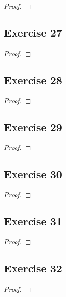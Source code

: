 \documentclass[14pt]{extarticle}
\begin{document}
\begin{proof}

\end{proof}

\subsection{Exercise 27}

\begin{proof}

\end{proof}

\subsection{Exercise 28}

\begin{proof}

\end{proof}

\subsection{Exercise 29}

\begin{proof}

\end{proof}

\subsection{Exercise 30}

\begin{proof}

\end{proof}

\subsection{Exercise 31}

\begin{proof}

\end{proof}

\subsection{Exercise 32}

\begin{proof}

\end{proof}
\end{document}
